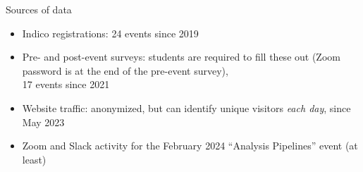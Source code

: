 \documentclass[aspectratio=169]{beamer}
\begin{document}
\begin{frame}{Sources of data}
\Large
\vspace{0.5 cm}
\begin{itemize}\setlength{\itemsep}{0.35 cm}
\item Indico registrations: 24 events since 2019
\item Pre- and post-event surveys: students are required to fill these out (Zoom password is at the end of the pre-event survey), \\ 17 events since 2021
\item Website traffic: anonymized, but can identify unique visitors {\it each day}, since May 2023
\item Zoom and Slack activity for the February 2024 ``Analysis Pipelines'' event (at least)
\end{itemize}
\end{frame}
\end{document}
